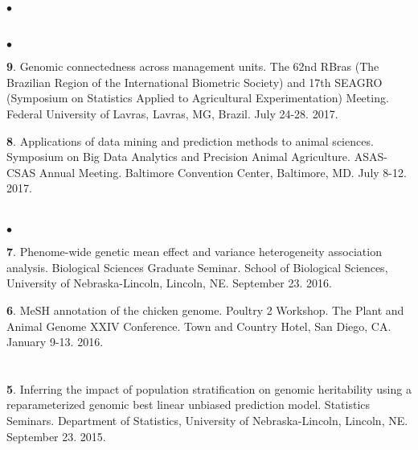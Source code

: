 \documentclass[margin,line,10pt]{res}
\newenvironment{list1}{
  \begin{list}{\ding{113}}{%
      \setlength{\itemsep}{0in}
      \setlength{\parsep}{0in} \setlength{\parskip}{0in}
      \setlength{\topsep}{0in} \setlength{\partopsep}{0in} 
      \setlength{\leftmargin}{0.17in}}}{\end{list}}
\newenvironment{list2}{
  \begin{list}{$\bullet$}{%
      \setlength{\itemsep}{0in}
      \setlength{\parsep}{0in} \setlength{\parskip}{0in}
      \setlength{\topsep}{0in} \setlength{\partopsep}{0in} 
      \setlength{\leftmargin}{0.2in}}}{\end{list}}
\begin{document}
\begin{resume}
\begin{list2}
\end{list2}


\section{}
\begin{list2}
\item [{\bf 9}.] Genomic connectedness across management units. The 62nd RBras (The Brazilian Region of the International Biometric Society) and 17th SEAGRO (Symposium on Statistics Applied to Agricultural Experimentation) Meeting. Federal University of Lavras, Lavras, MG, Brazil. July 24-28. 2017.
  
  \vspace{0.5cm}
  
  \item [{\bf 8}.] Applications of data mining and prediction methods to animal sciences. Symposium on Big Data Analytics and Precision Animal Agriculture. ASAS-CSAS Annual Meeting. Baltimore Convention Center, Baltimore, MD. July 8-12. 2017.
  
\end{list2}



\section{}
\begin{list2}
\item [{\bf 7}.] Phenome-wide genetic mean effect and variance heterogeneity association analysis. Biological Sciences Graduate Seminar. School of Biological Sciences, University of Nebraska-Lincoln, Lincoln, NE. September 23. 2016.
  
  \vspace{0.5cm}
  
  \item [{\bf 6}.] MeSH annotation of the chicken genome. Poultry 2 Workshop. The Plant and Animal Genome XXIV Conference. Town and Country Hotel, San Diego, CA. January 9-13. 2016.
  
\end{list2}

\section{}
\begin{list1}
\item [{\bf 5}.] Inferring the impact of population stratification on genomic heritability using a reparameterized genomic best linear unbiased prediction model. Statistics Seminars. Department of Statistics, University of Nebraska-Lincoln, Lincoln, NE. September 23. 2015.


\end{list1}
\end{resume}
\end{document}
